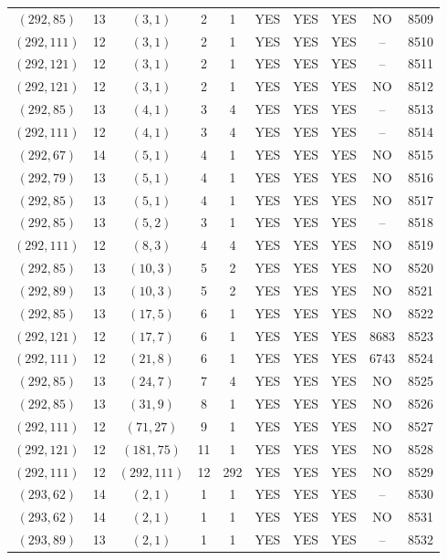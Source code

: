 \begin{longtable}{|c|c|c|c|c|c|c|c|c|c|}
$(292, 85)$ & 13 & $(3, 1)$ & 2 & 1 & YES & YES & YES & NO & 8509\\
$(292, 111)$ & 12 & $(3, 1)$ & 2 & 1 & YES & YES & YES & -- & 8510\\
$(292, 121)$ & 12 & $(3, 1)$ & 2 & 1 & YES & YES & YES & -- & 8511\\
$(292, 121)$ & 12 & $(3, 1)$ & 2 & 1 & YES & YES & YES & NO & 8512\\
$(292, 85)$ & 13 & $(4, 1)$ & 3 & 4 & YES & YES & YES & -- & 8513\\
$(292, 111)$ & 12 & $(4, 1)$ & 3 & 4 & YES & YES & YES & -- & 8514\\
$(292, 67)$ & 14 & $(5, 1)$ & 4 & 1 & YES & YES & YES & NO & 8515\\
$(292, 79)$ & 13 & $(5, 1)$ & 4 & 1 & YES & YES & YES & NO & 8516\\
$(292, 85)$ & 13 & $(5, 1)$ & 4 & 1 & YES & YES & YES & NO & 8517\\
$(292, 85)$ & 13 & $(5, 2)$ & 3 & 1 & YES & YES & YES & -- & 8518\\
$(292, 111)$ & 12 & $(8, 3)$ & 4 & 4 & YES & YES & YES & NO & 8519\\
$(292, 85)$ & 13 & $(10, 3)$ & 5 & 2 & YES & YES & YES & NO & 8520\\
$(292, 89)$ & 13 & $(10, 3)$ & 5 & 2 & YES & YES & YES & NO & 8521\\
$(292, 85)$ & 13 & $(17, 5)$ & 6 & 1 & YES & YES & YES & NO & 8522\\
$(292, 121)$ & 12 & $(17, 7)$ & 6 & 1 & YES & YES & YES & 8683 & 8523\\
$(292, 111)$ & 12 & $(21, 8)$ & 6 & 1 & YES & YES & YES & 6743 & 8524\\
$(292, 85)$ & 13 & $(24, 7)$ & 7 & 4 & YES & YES & YES & NO & 8525\\
$(292, 85)$ & 13 & $(31, 9)$ & 8 & 1 & YES & YES & YES & NO & 8526\\
$(292, 111)$ & 12 & $(71, 27)$ & 9 & 1 & YES & YES & YES & NO & 8527\\
$(292, 121)$ & 12 & $(181, 75)$ & 11 & 1 & YES & YES & YES & NO & 8528\\
$(292, 111)$ & 12 & $(292, 111)$ & 12 & 292 & YES & YES & YES & NO & 8529\\
$(293, 62)$ & 14 & $(2, 1)$ & 1 & 1 & YES & YES & YES & -- & 8530\\
$(293, 62)$ & 14 & $(2, 1)$ & 1 & 1 & YES & YES & YES & NO & 8531\\
$(293, 89)$ & 13 & $(2, 1)$ & 1 & 1 & YES & YES & YES & -- & 8532\\

\end{longtable}
